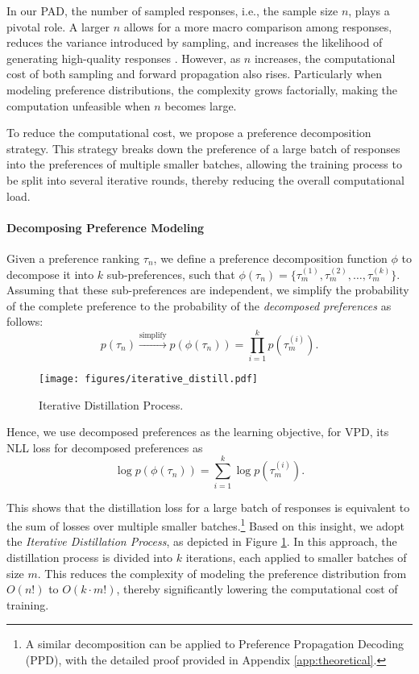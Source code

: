 In our PAD, the number of sampled responses, i.e., the sample size $n$, plays a pivotal role. A larger $n$ allows for a more macro comparison among responses, reduces the variance introduced by sampling, and increases the likelihood of generating high-quality responses \citep{brown-2024-largelanguagemonkeysscaling}. However, as $n$ increases, the computational cost of both sampling and forward propagation also rises. Particularly when modeling preference distributions, the complexity grows factorially, making the computation unfeasible when $n$ becomes large.

To reduce the computational cost, we propose a preference decomposition strategy. This strategy breaks down the preference of a large batch of responses into the preferences of multiple smaller batches, allowing the training process to be split into several iterative rounds, thereby reducing the overall computational load.

\paragraph{Decomposing Preference Modeling}
Given a preference ranking $\tau_n$, we define a preference decomposition function $\phi$ to decompose it into $k$ sub-preferences, such that $\phi(\tau_n) = \{\tau_m^{(1)}, \tau_m^{(2)}, \dots, \tau_m^{(k)}\}$.
Assuming that these sub-preferences are independent, we simplify the probability of the complete preference to the probability of the \textit{decomposed preferences} as follows:
\begin{equation}
\label{eq:approx}
p(\tau_n) \xrightarrow{\text{simplify}}  p(\phi(\tau_n)) = \prod_{i=1}^{k} p(\tau_m^{(i)}).
\end{equation}

\begin{figure}[!t]
    \centering
    \vspace{-2mm}
    \texttt{[image: figures/iterative\_distill.pdf]}
    \vspace{-7mm}
    \caption{Iterative Distillation Process. }
    \label{fig:iter_distll}
    \vspace{-4mm}
\end{figure}

Hence, we use decomposed preferences as the learning objective, for VPD, its NLL loss for decomposed preferences as
\begin{equation}
\label{eq:log_approx}
\log p(\phi(\tau_n)) = \sum_{i=1}^{k} \log p(\tau_m^{(i)}).
\end{equation}

This shows that the distillation loss for a large batch of responses is equivalent to the sum of losses over multiple smaller batches.\footnote{A similar decomposition can be applied to Preference Propagation Decoding (PPD), with the detailed proof provided in Appendix \ref{app:theoretical}. } Based on this insight, we adopt the \textit{Iterative Distillation Process}, as depicted in Figure \ref{fig:iter_distll}. In this approach, the distillation process is divided into \(k\) iterations, each applied to smaller batches of size \(m\). This reduces the complexity of modeling the preference distribution from \(O(n!)\) to \(O(k \cdot m!)\), thereby significantly lowering the computational cost of training.
